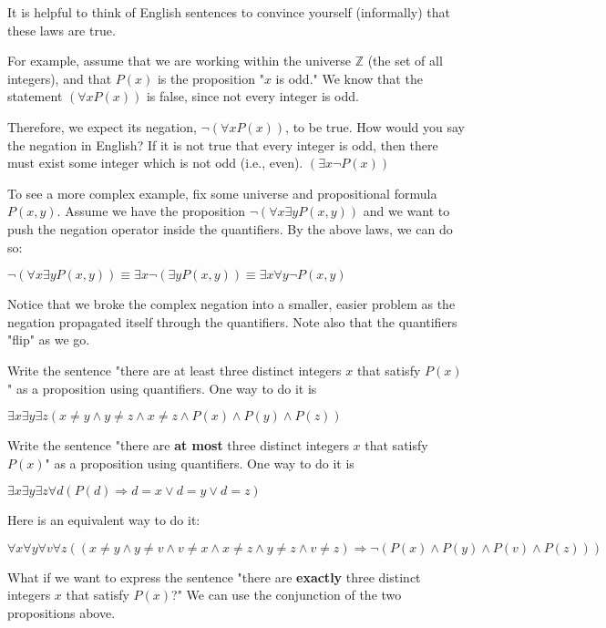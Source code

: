 \documentclass[12pt,a4paper]{article}
\begin{document}
\bigbreak

It is helpful to think of English sentences to convince yourself (informally) that these laws are true.

\bigbreak

For example, assume that we are working within the universe $\mathbb{Z}$ (the set of all integers), and that $P(x)$ is the proposition "$x$ is odd." We know that the statement $(\forall xP(x))$ is false, since not every integer is odd.

\bigbreak

Therefore, we expect its negation, $\neg(\forall xP(x))$, to be true. How would you say the negation in English? If it is not true that every integer is odd, then there must exist some integer which is not odd (i.e., even). $(\exists x\neg P(x))$

\bigbreak

To see a more complex example, fix some universe and propositional formula $P(x,y)$. Assume we have the proposition $\neg(\forall x\exists yP(x,y))$ and we want to push the negation operator inside the quantifiers. By the above laws, we can do so:
\begin{center}
	$\neg(\forall x\exists yP(x,y))\equiv\exists x\neg(\exists yP(x,y))\equiv\exists x\forall y\neg P(x,y)$
\end{center}

Notice that we broke the complex negation into a smaller, easier problem as the negation propagated itself through the quantifiers. Note also that the quantifiers "flip" as we go.

\newpage

Write the sentence "there are at least three distinct integers $x$ that satisfy $P(x)$" as a proposition using quantifiers. One way to do it is
\begin{center}
	$\exists x\exists y\exists z(x\neq y\wedge y\neq z\wedge x\neq z\wedge P(x) \wedge P(y)\wedge P(z))$
\end{center}

Write the sentence "there are \textbf{at most} three distinct integers $x$ that satisfy $P(x)$" as a proposition using quantifiers. One way to do it is
\begin{center}
	$\exists x\exists y\exists z\forall d(P(d)\Rightarrow d=x\vee d=y\vee d=z)$
\end{center}

Here is an equivalent way to do it:
\begin{center}
	$\forall x\forall y\forall v\forall z((x\neq y\wedge y\neq v \wedge v\neq x\wedge x\neq z\wedge y\neq z \wedge v\neq z)\Rightarrow\neg(P(x)\wedge P(y)\wedge P(v)\wedge P(z)))$
\end{center}

What if we want to express the sentence "there are \textbf{exactly} three distinct integers $x$ that satisfy $P(x)$?" We can use the conjunction of the two propositions above.
\end{document}

